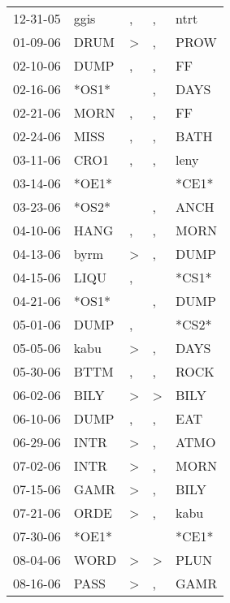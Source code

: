 \begin{supertabular}{lllll}
 12-31-05 &   ggis &                , &             , &   ntrt \\
 01-09-06 &   DRUM &     \textgreater &             , &   PROW \\
 02-10-06 &   DUMP &                , &             , &     FF \\
 02-16-06 &  *OS1* &                  &             , &   DAYS \\
 02-21-06 &   MORN &                , &             , &     FF \\
 02-24-06 &   MISS &                , &             , &   BATH \\
 03-11-06 &   CRO1 &                , &             , &   leny \\
 03-14-06 &  *OE1* &                  &               &  *CE1* \\
 03-23-06 &  *OS2* &                  &             , &   ANCH \\
 04-10-06 &   HANG &                , &             , &   MORN \\
 04-13-06 &   byrm &     \textgreater &             , &   DUMP \\
 04-15-06 &   LIQU &                , &               &  *CS1* \\
 04-21-06 &  *OS1* &                  &             , &   DUMP \\
 05-01-06 &   DUMP &                , &               &  *CS2* \\
 05-05-06 &   kabu &     \textgreater &             , &   DAYS \\
 05-30-06 &   BTTM &                , &             , &   ROCK \\
 06-02-06 &   BILY &     \textgreater &  \textgreater &   BILY \\
 06-10-06 &   DUMP &                , &             , &    EAT \\
 06-29-06 &   INTR &     \textgreater &             , &   ATMO \\
 07-02-06 &   INTR &     \textgreater &             , &   MORN \\
 07-15-06 &   GAMR &     \textgreater &             , &   BILY \\
 07-21-06 &   ORDE &     \textgreater &             , &   kabu \\
 07-30-06 &  *OE1* &                  &               &  *CE1* \\
 08-04-06 &   WORD &     \textgreater &  \textgreater &   PLUN \\
 08-16-06 &   PASS &     \textgreater &             , &   GAMR \\

\end{supertabular}
